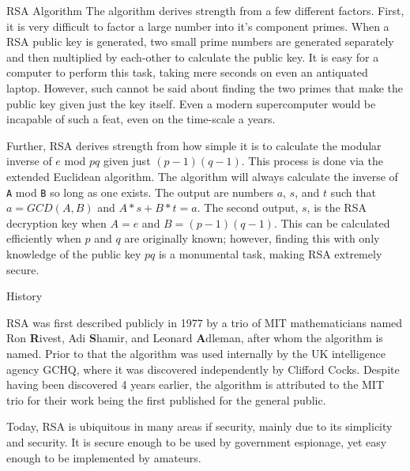 \documentclass[landscape,fontscale=.4,paperwidth=48in,paperheight=36in]{baposter} %
\begin{document}
\begin{poster}
\begin{posterbox}[name=rsa,column=13,row=0,span=17]{RSA Algorithm}
The algorithm derives strength from  a few different factors. First, it is very difficult to factor a large number into it's component primes. When a RSA public key is generated, two small prime numbers are generated separately and then multiplied by each-other to calculate the public key. It is easy for a computer to perform this task, taking mere seconds on even an antiquated laptop. However, such cannot be said about finding the two primes that make the public key given just the key itself. Even a modern supercomputer would be incapable of such a feat, even on the time-scale a years.

Further, RSA derives strength from how simple it is to calculate the modular inverse of $e$ mod $pq$ given just $(p-1)(q-1)$. This process is done via the extended Euclidean algorithm. The algorithm will always calculate the inverse of \verb|A| mod \verb|B| so long as one exists. The output are numbers $a$, $s$, and $t$ such that $a = GCD(A,B)$ and $A*s + B*t = a$. The second output, $s$, is the RSA decryption key when $A=e$ and ${B=(p-1)(q-1)}$. This can be calculated efficiently when $p$ and $q$ are originally known; however, finding this with only knowledge of the public key $pq$ is a monumental task, making RSA extremely secure.  
\end{posterbox}



\begin{posterbox}[name=history, column=13, below=rsa,span=17]{History}
\begin{multicols}{2}
RSA was first described publicly in 1977 by a trio of MIT mathematicians named Ron \textbf{R}ivest, Adi \textbf{S}hamir, and Leonard \textbf{A}dleman, after whom the algorithm is named. Prior to that the algorithm was used internally by the UK intelligence agency GCHQ, where it was discovered independently by Clifford Cocks. Despite having been discovered 4 years earlier, the algorithm is attributed to the MIT trio for their work being the first published for the general public.

Today, RSA is ubiquitous in many areas if security, mainly due to its simplicity and security. It is secure enough to be used by government espionage, yet easy enough to be implemented by amateurs. 


\end{multicols}
\end{posterbox}
\end{poster}
\end{document}
